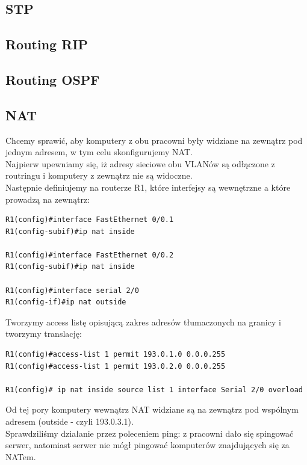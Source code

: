 \documentclass[11pt,a4paper]{article}
\begin{document}
\subsection{STP}
\subsection{Routing RIP}
\subsection{Routing OSPF}
\subsection{NAT}
Chcemy sprawić, aby komputery z obu pracowni były widziane na zewnątrz pod jednym adresem, w tym celu skonfigurujemy NAT.\\
Najpierw upewniamy się, iż adresy sieciowe obu VLANów są odłączone z routringu i komputery z zewnątrz nie są widoczne.\\
Następnie definiujemy na routerze R1, które interfejsy są wewnętrzne a które prowadzą na zewnątrz:
\begin{lstlisting}
R1(config)#interface FastEthernet 0/0.1
R1(config-subif)#ip nat inside

R1(config)#interface FastEthernet 0/0.2
R1(config-subif)#ip nat inside

R1(config)#interface serial 2/0
R1(config-if)#ip nat outside
\end{lstlisting}

Tworzymy access listę opisującą zakres adresów tłumaczonych na granicy i tworzymy translację:
\begin{lstlisting}
R1(config)#access-list 1 permit 193.0.1.0 0.0.0.255
R1(config)#access-list 1 permit 193.0.2.0 0.0.0.255

R1(config)# ip nat inside source list 1 interface Serial 2/0 overload
\end{lstlisting}
Od tej pory komputery wewnątrz NAT widziane są na zewnątrz pod wspólnym adresem (outside - czyli 193.0.3.1).\\
Sprawdziliśmy działanie przez poleceniem ping: z pracowni dało się spingować serwer, natomiast serwer nie mógł pingować komputerów znajdujących się za NATem.
 
\end{document}
